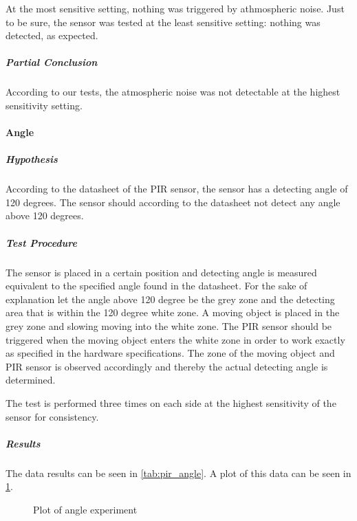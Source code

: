At the most sensitive setting, nothing was triggered by athmospheric noise. Just
to be sure, the sensor was tested at the least sensitive setting: nothing was
detected, as expected.

\subparagraph{Partial Conclusion}
\label{subp:SenPartial Conclusion}

According to our tests, the atmospheric noise was not detectable at the highest
sensitivity setting.

\paragraph{Angle}
\label{par:Angle}

\subparagraph{Hypothesis}
\label{subp:AngHypothesis}
According to the datasheet of the PIR sensor,
the sensor has a detecting angle of 120 degrees.
The sensor should according to the datasheet not detect any angle above 120 degrees.

\subparagraph{Test Procedure}
\label{subp:AngTest Procedure}
The sensor is placed in a certain position and detecting angle is measured equivalent to
the specified angle found in the datasheet.
For the sake of explanation let the angle above 120 degree be the grey zone and
the detecting area that is within the 120 degree white zone.
A moving object is placed in the grey zone and slowing moving into the white zone.
The PIR sensor should be triggered when the moving object enters the white zone in order
to work exactly as specified in the hardware specifications.
The zone of the moving object and PIR sensor is observed accordingly
and thereby the actual detecting angle is determined.

The test is performed three times on each side at the highest sensitivity of the sensor for consistency.

\subparagraph{Results}
\label{subp:AngResults}

The data results can be seen in \cref{tab:pir_angle}. A plot of this data can be
seen in \cref{fig:pir_angle}.

\begin{figure}[htbp]
\centering
{}
\caption{Plot of angle experiment}\label{fig:pir_angle}
\end{figure}

